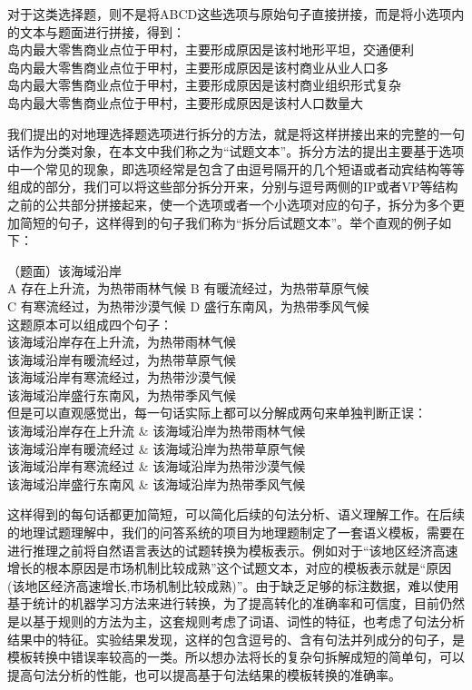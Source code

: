 \documentclass[master, winfont]{njuthesis}
\begin{document}
对于这类选择题，则不是将ABCD这些选项与原始句子直接拼接，而是将小选项内的文本与题面进行拼接，得到：\\
岛内最大零售商业点位于甲村，主要形成原因是该村地形平坦，交通便利\\
岛内最大零售商业点位于甲村，主要形成原因是该村商业从业人口多\\
岛内最大零售商业点位于甲村，主要形成原因是该村商业组织形式复杂\\
岛内最大零售商业点位于甲村，主要形成原因是该村人口数量大

我们提出的对地理选择题选项进行拆分的方法，就是将这样拼接出来的完整的一句话作为分类对象，在本文中我们称之为“试题文本”。拆分方法的提出主要基于选项中一个常见的现象，即选项经常是包含了由逗号隔开的几个短语或者动宾结构等等组成的部分，我们可以将这些部分拆分开来，分别与逗号两侧的IP或者VP等结构之前的公共部分拼接起来，使一个选项或者一个小选项对应的句子，拆分为多个更加简短的句子，这样得到的句子我们称为“拆分后试题文本”。举个直观的例子如下：

（题面）该海域沿岸 \\
A 存在上升流，为热带雨林气候   B 有暖流经过，为热带草原气候\\
C 有寒流经过，为热带沙漠气候   D 盛行东南风，为热带季风气候\\

这题原本可以组成四个句子：\\
该海域沿岸存在上升流，为热带雨林气候\\
该海域沿岸有暖流经过，为热带草原气候\\
该海域沿岸有寒流经过，为热带沙漠气候\\
该海域沿岸盛行东南风，为热带季风气候\\

但是可以直观感觉出，每一句话实际上都可以分解成两句来单独判断正误：\\
该海域沿岸存在上升流 \& 该海域沿岸为热带雨林气候\\
该海域沿岸有暖流经过 \& 该海域沿岸为热带草原气候\\
该海域沿岸有寒流经过 \& 该海域沿岸为热带沙漠气候\\
该海域沿岸盛行东南风 \& 该海域沿岸为热带季风气候

这样得到的每句话都更加简短，可以简化后续的句法分析、语义理解工作。在后续的地理试题理解中，我们的问答系统的项目为地理题制定了一套语义模板，需要在进行推理之前将自然语言表达的试题转换为模板表示。例如对于“该地区经济高速增长的根本原因是市场机制比较成熟”这个试题文本，对应的模板表示就是“原因(该地区经济高速增长,市场机制比较成熟)”。由于缺乏足够的标注数据，难以使用基于统计的机器学习方法来进行转换，为了提高转化的准确率和可信度，目前仍然是以基于规则的方法为主，这套规则考虑了词语、词性的特征，也考虑了句法分析结果中的特征。实验结果发现，这样的包含逗号的、含有句法并列成分的句子，是模板转换中错误率较高的一类。所以想办法将长的复杂句拆解成短的简单句，可以提高句法分析的性能，也可以提高基于句法结果的模板转换的准确率。
\end{document}
